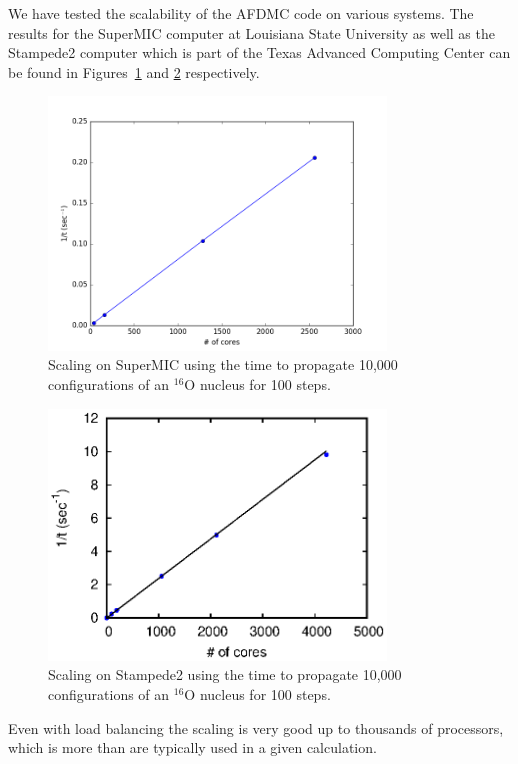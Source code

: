 We have tested the scalability of the AFDMC code on various systems. The results for the SuperMIC computer at Louisiana State University as well as the Stampede2 computer which is part of the Texas Advanced Computing Center can be found in Figures~\ref{fig:supermic} and \ref{fig:stampede2} respectively.
\begin{figure}[h!]
   \centering
   \includegraphics[width=0.8\textwidth]{figures/supermic.png}
   \caption{Scaling on SuperMIC using the time to propagate 10,000 configurations of an $^{16}$O nucleus for 100 steps.}
   \label{fig:supermic}
\end{figure}
\begin{figure}[h!]
   \centering
   \includegraphics[width=0.8\textwidth]{figures/stampede.eps}
   \caption{Scaling on Stampede2 using the time to propagate 10,000 configurations of an $^{16}$O nucleus for 100 steps.}
   \label{fig:stampede2}
\end{figure}
Even with load balancing the scaling is very good up to thousands of processors, which is more than are typically used in a given calculation.
